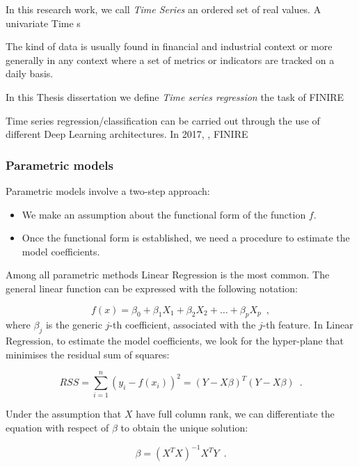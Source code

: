 In this research work, we call \textit{Time Series} an ordered set of real values. A univariate Time s



The kind of data is usually found in financial and industrial context or more generally in any context where a set of metrics or indicators are tracked on a daily basis. 


In this Thesis dissertation we define \textit{Time series regression} the task of FINIRE

Time series regression/classification can be carried out through the use of different Deep Learning architectures. 
In 2017, \citep{wang2017time}, FINIRE 



\subsubsection{Parametric models} \label{Parametric models}

Parametric models involve a two-step approach:
\begin{itemize}
    \item We make an assumption about the functional form of the function $f$.  
    \item Once the functional form is established, we need a procedure to estimate the model coefficients. 

\end{itemize}
	 
Among all parametric methods Linear Regression is the most common. The general linear function can be expressed with the following notation:

\begin{equation}
    f(x)=\beta_0 + \beta_1X_1 + \beta_2X_2 + \ldots + \beta_pX_p
    \enspace,
\end{equation}
where $\beta_j$ is the generic $j$-th coefficient, associated with the $j$-th feature.
In Linear Regression, to estimate the model coefficients, we look for the hyper-plane that minimises the residual sum of squares:

\begin{equation}
    RSS = \sum_{i=1}^{n}(y_i -f(x_i))^2 = (Y - X\beta)^T(Y - X\beta)
    \enspace.
\end{equation}

Under the assumption that $X$ have full column rank, we can differentiate the equation with respect of $\beta$ to obtain the unique solution:

\begin{equation}
    \beta = (X^TX)^{-1}X^TY
    \enspace.
\end{equation}

